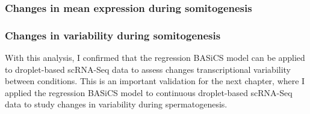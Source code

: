 \subsubsection{Changes in mean expression during somitogenesis}

\subsubsection{Changes in variability during somitogenesis}


With this analysis, I confirmed that the regression BASiCS model can be applied to droplet-based scRNA-Seq data to assess changes transcriptional variability between conditions. This is an important validation for the next chapter, where I applied the regression BASiCS model to continuous droplet-based scRNA-Seq data to study changes in variability during spermatogenesis. 
